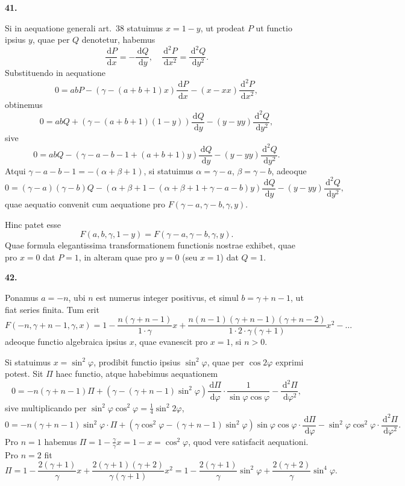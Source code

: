 \documentclass[12pt,a4paper]{article}
\newcommand{\dd}{\,\mathrm{d}}
\begin{document}
\textbf{41.}

Si in aequatione generali art.\ 38 statuimus $x = 1 - y$, ut prodeat $P$
ut functio ipsius $y$, quae per $Q$ denotetur, habemus
\[
\frac{\dd P}{\dd x} = -\frac{\dd Q}{\dd y}, \quad \frac{\dd^2 P}{\dd x^2} = \frac{\dd^2 Q}{\dd y^2}.
\]
Substituendo in aequatione
\[
0 = abP - (\gamma - (a+b+1)x) \frac{\dd P}{\dd x} - (x-xx) \frac{\dd^2 P}{\dd x^2},
\]
obtinemus
\[
0 = abQ + (\gamma - (a+b+1)(1-y)) \frac{\dd Q}{\dd y} - (y-yy) \frac{\dd^2 Q}{\dd y^2},
\]
sive
\[
0 = abQ - (\gamma - a - b - 1 + (a+b+1)y) \frac{\dd Q}{\dd y} - (y-yy) \frac{\dd^2 Q}{\dd y^2}.
\]
Atqui $\gamma - a - b - 1 = -(\alpha + \beta + 1)$, si statuimus $\alpha = \gamma - a$, $\beta = \gamma - b$,
adeoque
\[
0 = (\gamma - a)(\gamma - b) Q - (\alpha + \beta + 1 - (\alpha + \beta + 1 + \gamma - a - b)y) \frac{\dd Q}{\dd y} - (y-yy) \frac{\dd^2 Q}{\dd y^2},
\]
quae aequatio convenit cum aequatione pro $F(\gamma-a, \gamma-b, \gamma, y)$.

Hinc patet esse
\[
F(a, b, \gamma, 1-y) = F(\gamma-a, \gamma-b, \gamma, y).
\]
Quae formula elegantissima transformationem functionis nostrae exhibet, quae
pro $x = 0$ dat $P = 1$, in alteram quae pro $y = 0$ (seu $x = 1$) dat $Q = 1$.

\textbf{42.}

Ponamus $a = -n$, ubi $n$ est numerus integer positivus, et simul
$b = \gamma + n - 1$, ut fiat series finita. Tum erit
\[
F(-n, \gamma+n-1, \gamma, x) = 1 - \frac{n(\gamma+n-1)}{1 \cdot \gamma} x + \frac{n(n-1)(\gamma+n-1)(\gamma+n-2)}{1 \cdot 2 \cdot \gamma(\gamma+1)} x^2 - \ldots
\]
adeoque functio algebraica ipsius $x$, quae evanescit pro $x = 1$, si $n > 0$.

Si statuimus $x = \sin^2 \varphi$, prodibit functio ipsius $\sin^2 \varphi$, quae per
$\cos 2\varphi$ exprimi potest. Sit $\Pi$ haec functio, atque habebimus aequationem
\[
0 = -n(\gamma+n-1) \Pi + (\gamma - (\gamma+n-1) \sin^2 \varphi) \frac{\dd \Pi}{\dd \varphi} \cdot \frac{1}{\sin \varphi \cos \varphi} - \frac{\dd^2 \Pi}{\dd \varphi^2},
\]
sive multiplicando per $\sin^2 \varphi \cos^2 \varphi = \tfrac{1}{4} \sin^2 2\varphi$,
\[
0 = -n(\gamma+n-1) \sin^2 \varphi \cdot \Pi + (\gamma \cos^2 \varphi - (\gamma+n-1) \sin^2 \varphi) \sin \varphi \cos \varphi \cdot \frac{\dd \Pi}{\dd \varphi} - \sin^2 \varphi \cos^2 \varphi \cdot \frac{\dd^2 \Pi}{\dd \varphi^2}.
\]
Pro $n = 1$ habemus $\Pi = 1 - \frac{\gamma}{\gamma} x = 1 - x = \cos^2 \varphi$, quod vere satisfacit
aequationi. Pro $n = 2$ fit
\[
\Pi = 1 - \frac{2(\gamma+1)}{\gamma} x + \frac{2(\gamma+1)(\gamma+2)}{\gamma(\gamma+1)} x^2 = 1 - \frac{2(\gamma+1)}{\gamma} \sin^2 \varphi + \frac{2(\gamma+2)}{\gamma} \sin^4 \varphi.
\]
\end{document}
